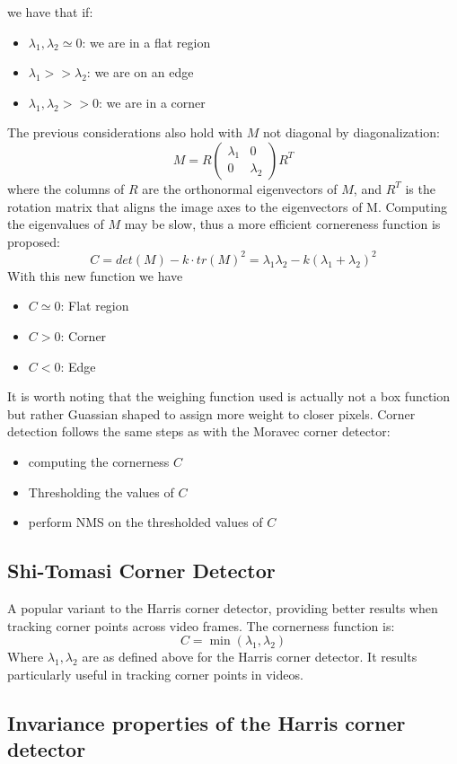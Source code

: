 \documentclass{article}
\begin{document}
we have that if: 
\begin{itemize}
  \item $\lambda_1, \lambda_2 \simeq 0$: we are in a flat region 
  \item $\lambda_1 >> \lambda_2 $: we are on an edge
  \item $\lambda_1, \lambda_2 >> 0$: we are in a corner
\end{itemize}
The previous considerations also hold with $M$ not diagonal by diagonalization:
\[
  M = R \begin{pmatrix}
    \lambda_1 & 0 \\ 0 & \lambda_2
  \end{pmatrix} R^T
\]
where the columns of $R$ are the orthonormal eigenvectors of $M$, and  $R^T$ is the rotation matrix that aligns the image axes to the eigenvectors of M.
Computing the eigenvalues of $M$ may be slow, thus a more efficient cornereness function is proposed: 
\[
  C= det(M)-k \cdot tr(M)^2 = \lambda_1\lambda_2 -k (\lambda_1+\lambda_2)^2
\]
With this new function we have 
\begin{itemize}
  \item $C \simeq 0$: Flat region
  \item $C > 0$: Corner
  \item $C < 0$: Edge
\end{itemize}
It is worth noting that the weighing function used is actually not a box function but rather Guassian shaped to assign more weight to closer pixels. Corner detection follows the same steps as with the Moravec corner detector:
\begin{itemize}
  \item computing the cornerness $C$ 
  \item Thresholding the values of $C$ 
  \item perform NMS on the thresholded values of $C$
\end{itemize}



\subsection{Shi-Tomasi Corner Detector}
A popular variant to the Harris corner detector, providing better results when tracking corner points across  video frames. The cornerness function is:
\[
  C=\min(\lambda_1,\lambda_2)
\]
Where $\lambda_1, \lambda_2$ are as defined above for the Harris corner detector.
It results particularly useful in tracking corner points in videos. 
\subsection{Invariance properties of the Harris corner detector}
\end{document}
